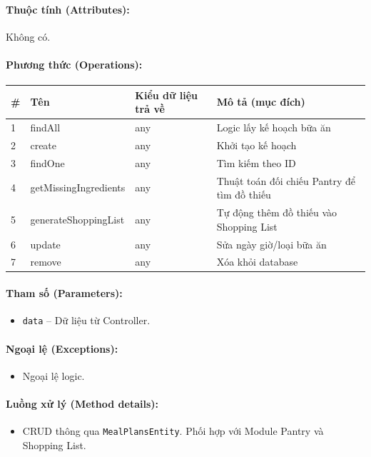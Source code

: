 \documentclass[12pt,a4paper]{article}
\begin{document}
\paragraph{Thuộc tính (Attributes):}
Không có.

\paragraph{Phương thức (Operations):}
\begin{longtable}{|p{0.6cm}|p{5.0cm}|p{2.8cm}|p{5.4cm}|}
\hline
\textbf{\#} & \textbf{Tên} & \textbf{Kiểu dữ liệu trả về} & \textbf{Mô tả (mục đích)} \\ \hline
\endhead
1 & findAll & any & Logic lấy kế hoạch bữa ăn \\ \hline
2 & create & any & Khởi tạo kế hoạch \\ \hline
3 & findOne & any & Tìm kiếm theo ID \\ \hline
4 & getMissingIngredients & any & Thuật toán đối chiếu Pantry để tìm đồ thiếu \\ \hline
5 & generateShoppingList & any & Tự động thêm đồ thiếu vào Shopping List \\ \hline
6 & update & any & Sửa ngày giờ/loại bữa ăn \\ \hline
7 & remove & any & Xóa khỏi database \\ \hline
\end{longtable}

\paragraph{Tham số (Parameters):}
\begin{itemize}[leftmargin=*]
    \item \texttt{data} – Dữ liệu từ Controller.
\end{itemize}


\paragraph{Ngoại lệ (Exceptions):}
\begin{itemize}[leftmargin=*]
    \item Ngoại lệ logic.
\end{itemize}


\paragraph{Luồng xử lý (Method details):}
\begin{itemize}[leftmargin=*]
    \item CRUD thông qua \texttt{MealPlansEntity}. Phối hợp với Module Pantry và Shopping List.
\end{itemize}
\end{document}
